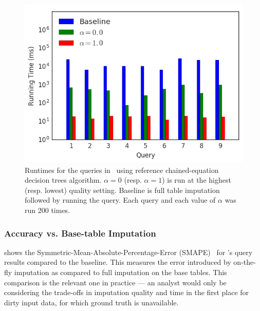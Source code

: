 \begin{figure}
\includegraphics[width=\columnwidth]{figures/running_times_combined_bar.png}
\caption{Runtimes for the queries in~ using reference
    chained-equation decision trees algorithm. $\alpha=0$ (resp. $\alpha=1$) is
    \ProjectName{} run at the highest (resp. lowest) quality setting. Baseline
    is full table imputation followed by running the query. Each query and each
    value of $\alpha$ was run 200 times.}
\label{fig:runtimes}
\end{figure}



\subsubsection{Accuracy vs. Base-table Imputation}

 shows the Symmetric-Mean-Absolute-Percentage-Error (SMAPE)~\cite{Makridakis2000451} for \ProjectName{}'s query results compared to the baseline.
This measures the error introduced by on-the-fly imputation as compared to full imputation on the base tables.
This comparison is the relevant one in practice --- an analyst would only be considering the trade-offs in imputation quality and time in the first place for dirty input data, for which ground truth is unavailable.

